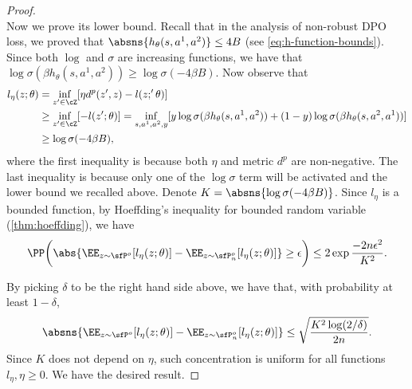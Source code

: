 \begin{proof}
\begin{equation*}
    \end{equation*}
    Now we prove its lower bound. Recall that in the analysis of non-robust DPO loss, we proved that $\absns{h_\theta(s,a^1,a^2)}\leq 4B$ (see \cref{eq:h-function-bounds}). Since both $\log$ and $\sigma$ are increasing functions, we have that $\log\sigma(\beta h_\theta(s,a^1,a^2)) \geq \log \sigma(-4\beta B)$. Now observe that
    \begin{align*}
        l_\eta(z;\theta) &= \inf_{z'\in\cZ}[\eta d^p(z',z)-l(z;'\theta)] \\ &\geq \inf_{z'\in\cZ} [-l(z';\theta)] = \inf_{s,a^1,a^2,y} [y\log\sigma(\beta h_\theta(s,a^1,a^2)) + (1-y) \log\sigma(\beta h_\theta(s,a^2,a^1))] \\
        &\geq \log\sigma(-4\beta B),
    \end{align*}
    where the first inequality is because both $\eta$ and metric $d^p$ are non-negative. The last inequality is because only one of the $\log\sigma$ term will be activated and the lower bound we recalled above. Denote $K=\absns{\log\sigma(-4\beta B)}$. Since $l_\eta$ is a bounded function, by Hoeffding's inequality for bounded random variable (\cref{thm:hoeffding}), we have
    \begin{equation*}
        \PP\bigg(\abs{\EE_{z\sim \sfP^o}[l_\eta(z;\theta)] - \EE_{z\sim \sfP^o_n}[l_\eta(z;\theta)]} \geq \epsilon \bigg) \leq 2\exp{\frac{-2n\epsilon^2}{K^2}}.         
    \end{equation*}

    By picking $\delta$ to be the right hand side above, we have that, with probability at least $1-\delta$,
    \begin{equation*}
        \absns{\EE_{z\sim \sfP^o}[l_\eta(z;\theta)] - \EE_{z\sim \sfP^o_n}[l_\eta(z;\theta)]} \leq \sqrt{\frac{K^2\log(2/\delta)}{2n}}.
    \end{equation*}
    Since $K$ does not depend on $\eta$, such concentration is uniform for all functions $l_\eta, \eta\geq 0$. We have the desired result.
\end{proof}


